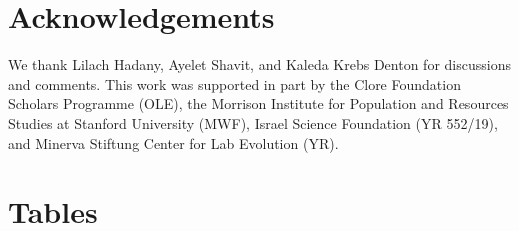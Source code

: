 \documentclass[12pt]{extarticle}
\begin{document}
{\small
\section*{Acknowledgements}
We thank Lilach Hadany, Ayelet Shavit, and Kaleda Krebs Denton for discussions and comments.
This work was supported in part by
the Clore Foundation Scholars Programme (OLE),
the Morrison Institute for Population and Resources Studies at Stanford University (MWF),
Israel Science Foundation (YR 552/19),
and Minerva Stiftung Center for Lab Evolution (YR).








\newpage


\section*{Tables}


}
\end{document}
